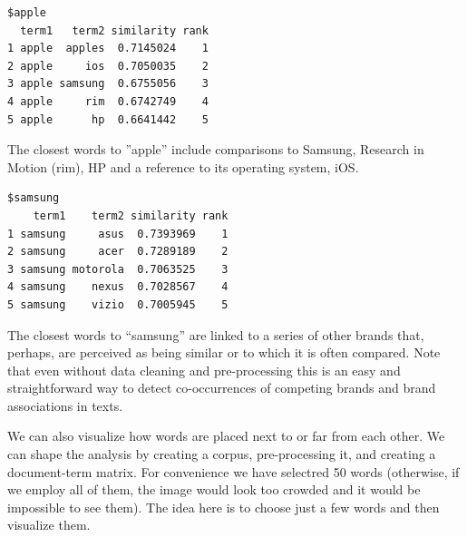 \begin{verbatim}
$apple
  term1   term2 similarity rank
1 apple  apples  0.7145024    1
2 apple     ios  0.7050035    2
3 apple samsung  0.6755056    3
4 apple     rim  0.6742749    4
5 apple      hp  0.6641442    5
\end{verbatim}

The closest words to ''apple'' include comparisons to Samsung, Research in Motion (rim), HP and a reference to its operating
system, iOS.

\begin{Shaded}
\begin{Highlighting}[]
\OtherTok{\textless{}{-}} \NormalTok{(}\NormalTok{), } \NormalTok{, } \NormalTok{)}
\end{Highlighting}
\end{Shaded}

\begin{verbatim}
$samsung
    term1    term2 similarity rank
1 samsung     asus  0.7393969    1
2 samsung     acer  0.7289189    2
3 samsung motorola  0.7063525    3
4 samsung    nexus  0.7028567    4
5 samsung    vizio  0.7005945    5
\end{verbatim}

The closest words to ``samsung'' are linked to a series of other brands
that, perhaps, are perceived as being similar or to which it is often compared.
Note that even without data cleaning and pre-processing this is an easy
and straightforward way to detect co-occurrences of competing brands and
brand associations in texts.

We can also visualize how words are placed next to or far from each
other. We can shape the analysis by creating a corpus, pre-processing it,
and creating a document-term matrix. For convenience we have selectred 50 words
(otherwise, if we employ all of them, the image would look too crowded
and it would be impossible to see them). The idea here is to choose just a
few words and then visualize them.

